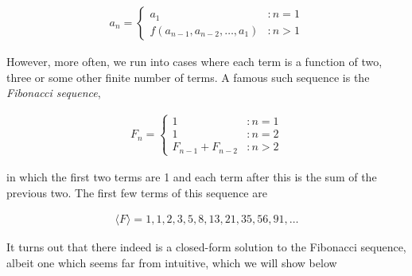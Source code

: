\documentclass[twoside]{report}
\begin{document}
\begin{align*}
	a_n =
	\begin{cases}
		a_1 &: n = 1 \\
		f(a_{n - 1}, a_{n - 2}, \dots, a_1) &: n > 1
	\end{cases}
\end{align*}

However, more often, we run into cases where each term is a function of two, three or some other finite number of terms. A famous such sequence is the \emph{Fibonacci sequence},

\begin{align*}
	F_n =
	\begin{cases}
		1 &: n = 1 \\
		1 &: n = 2 \\
		F_{n - 1} + F_{n - 2} &: n > 2
	\end{cases}
\end{align*}
 
in which the first two terms are 1 and each term after this is the sum of the previous two. The first few terms of this sequence are

\begin{align*}
	\langle F \rangle = 1, 1, 2, 3, 5, 8, 13, 21, 35, 56, 91, \dots
\end{align*}

It turns out that there indeed is a closed-form solution to the Fibonacci sequence, albeit one which seems far from intuitive, which we will show below 
\end{document}
